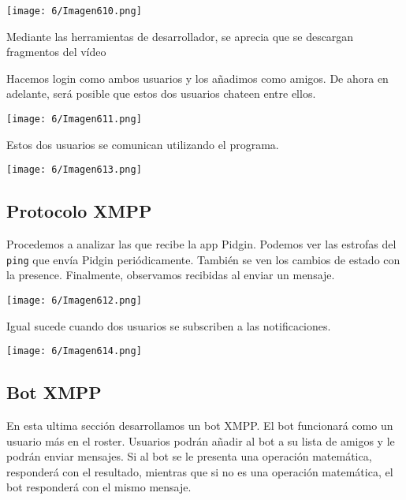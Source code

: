 \begin{minipage}{\linewidth}
	\centering
	\texttt{[image: 6/Imagen610.png]}
	\label{fig:6/1}
\end{minipage}

Mediante las herramientas de desarrollador, se aprecia que se descargan fragmentos del vídeo

Hacemos login como ambos usuarios y los añadimos como amigos.
De ahora en adelante, será posible que estos dos usuarios chateen entre ellos.

\begin{minipage}{\linewidth}
	\centering
	\texttt{[image: 6/Imagen611.png]}
	\label{fig:6/2}
\end{minipage}

Estos dos usuarios se comunican utilizando el programa.

\begin{minipage}{\linewidth}
	\centering
	\texttt{[image: 6/Imagen613.png]}
	\label{fig:6/3}
\end{minipage}

\subsection{Protocolo XMPP}
Procedemos a analizar las  que recibe la app Pidgin.
Podemos ver las estrofas del \lstinline{ping} que envía Pidgin periódicamente.
También se ven los cambios de estado con la  presence.
Finalmente, observamos  recibidas al enviar un mensaje.

\begin{minipage}{\linewidth}
	\centering
	\texttt{[image: 6/Imagen612.png]}
	\label{fig:6/4}
\end{minipage}

Igual sucede cuando dos usuarios se subscriben a las notificaciones.

\begin{minipage}{\linewidth}
	\centering
	\texttt{[image: 6/Imagen614.png]}
	\label{fig:6/5}
\end{minipage}

\subsection{Bot XMPP}
En esta ultima sección desarrollamos un bot XMPP{.}
El bot funcionará como un usuario más en el roster.
Usuarios podrán añadir al bot a su lista de amigos y le podrán enviar mensajes.
Si al bot se le presenta una operación matemática, responderá con el resultado,
mientras que si no es una operación matemática, el bot responderá con el mismo mensaje.

